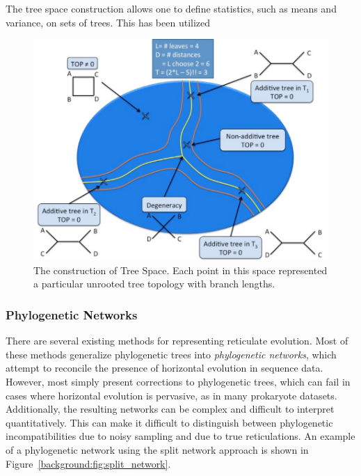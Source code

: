 The tree space construction allows one to define statistics, such as means and variance, on sets of trees.
This has been utilized 

\begin{figure}
\centering
\includegraphics[]{./fig/TreeSpace.pdf}
\caption[Tree Space Construction]{The construction of Tree Space. Each point in this space represented a particular unrooted tree topology with branch lengths.}
\label{background:fig:TreeSpace}
\end{figure}

\subsubsection{Phylogenetic Networks}

There are several existing methods for representing reticulate evolution.
Most of these methods generalize phylogenetic trees into \emph{phylogenetic networks}, which attempt to reconcile the presence of horizontal evolution in sequence data.
However, most simply present corrections to phylogenetic trees, which can fail in cases where horizontal evolution is pervasive, as in many prokaryote datasets.
Additionally, the resulting networks can be complex and difficult to interpret quantitatively.
This can make it difficult to distinguish between phylogenetic incompatibilities due to noisy sampling and due to true reticulations.
An example of a phylogenetic network using the split network approach is shown in Figure~\ref{background:fig:split_network}.


